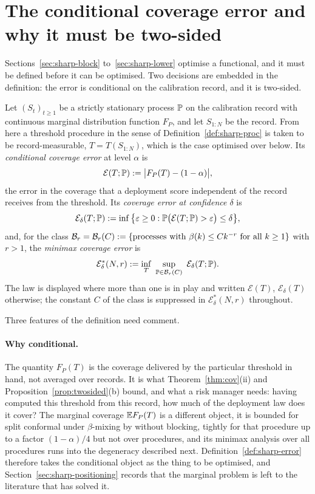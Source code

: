 \documentclass[../../../main.tex]{subfiles}
\begin{document}
\section{The conditional coverage error and why it must be two-sided}\label{sec:sharp-functional}

Sections~\ref{sec:sharp-block} to~\ref{sec:sharp-lower} optimise a functional, and it must be defined before it can be optimised. Two decisions are embedded in the definition: the error is conditional on the calibration record, and it is two-sided.

\begin{definition}\label{def:sharp-error}
Let $(S_t)_{t\ge1}$ be a strictly stationary process $\mathbb{P}$ on the calibration record with continuous marginal distribution function $F_P$, and let $S_{1:N}$ be the record. From here a threshold procedure in the sense of Definition~\ref{def:sharp-proc} is taken to be record-measurable, $T=T(S_{1:N})$, which is the case optimised over below. Its \emph{conditional coverage error} at level $\alpha$ is
\[
\mathcal E(T;\mathbb{P}):=\big|F_P(T)-(1-\alpha)\big| ,
\]
the error in the coverage that a deployment score independent of the record receives from the threshold. Its \emph{coverage error at confidence $\delta$} is
\[
\mathcal E_\delta(T;\mathbb{P}):=\inf\big\{\varepsilon\ge0:\mathbb{P}\big(\mathcal E(T;\mathbb{P})>\varepsilon\big)\le\delta\big\},
\]
and, for the class $\mathcal B_{r}=\mathcal B_{r}(C):=\{\text{processes with }\beta(k)\le Ck^{-r}\text{ for all }k\ge1\}$ with $r>1$, the \emph{minimax coverage error} is
\[
\mathcal E^*_\delta(N,r):=\inf_T\ \sup_{\Prob\in\Bclass{r}(C)}\ \mathcal E_\delta(T;\Prob).
\]
The law is displayed where more than one is in play and written $\mathcal E(T)$, $\mathcal E_\delta(T)$ otherwise; the constant $C$ of the class is suppressed in $\mathcal E^*_\delta(N,r)$ throughout.
\end{definition}

Three features of the definition need comment.

\paragraph{Why conditional.} The quantity $F_P(T)$ is the coverage delivered by the particular threshold in hand, not averaged over records. It is what Theorem~\ref{thm:cov}(ii) and Proposition~\ref{prop:twosided}(b) bound, and what a risk manager needs: having computed this threshold from this record, how much of the deployment law does it cover? The marginal coverage $\mathbb{E} F_P(T)$ is a different object, it is bounded for split conformal under $\beta$-mixing by \citet[Cor.~2]{barber2026} without blocking, tightly for that procedure up to a factor $(1-\alpha)/4$ \citep[Thm.~2]{barber2026} but not over procedures, and its minimax analysis over all procedures runs into the degeneracy described next. Definition~\ref{def:sharp-error} therefore takes the conditional object as the thing to be optimised, and Section~\ref{sec:sharp-positioning} records that the marginal problem is left to the literature that has solved it.
\end{document}
